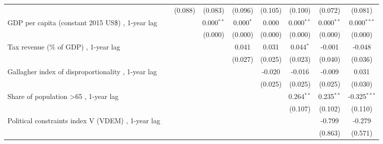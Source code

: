 \begin{table}[htbp]
\begin{tabular}{lcccccccc}
                                                                                              &              & (0.088)      & (0.083)       & (0.096)       & (0.105)       & (0.100)       & (0.072)      & (0.081)\\   
      GDP per capita (constant 2015 US\$) , 1-year lag                                        &              &              & 0.000$^{**}$  & 0.000$^{*}$   & 0.000         & 0.000$^{**}$  & 0.000$^{**}$ & 0.000$^{***}$\\   
                                                                                              &              &              & (0.000)       & (0.000)       & (0.000)       & (0.000)       & (0.000)      & (0.000)\\   
      Tax revenue (\% of GDP) , 1-year lag                                                    &              &              &               & 0.041         & 0.031         & 0.044$^{*}$   & -0.001       & -0.048\\   
                                                                                              &              &              &               & (0.027)       & (0.025)       & (0.023)       & (0.040)      & (0.036)\\   
      Gallagher index of disproportionality , 1-year lag                                      &              &              &               &               & -0.020        & -0.016        & -0.009       & 0.031\\   
                                                                                              &              &              &               &               & (0.025)       & (0.025)       & (0.025)      & (0.030)\\   
      Share of population >65 , 1-year lag                                                    &              &              &               &               &               & 0.264$^{**}$  & 0.235$^{**}$ & -0.325$^{***}$\\   
                                                                                              &              &              &               &               &               & (0.107)       & (0.102)      & (0.110)\\   
      Political constraints index V (VDEM) , 1-year lag                                       &              &              &               &               &               &               & -0.799       & -0.279\\   
                                                                                              &              &              &               &               &               &               & (0.863)      & (0.571)\\   

\end{tabular}
\end{table}
